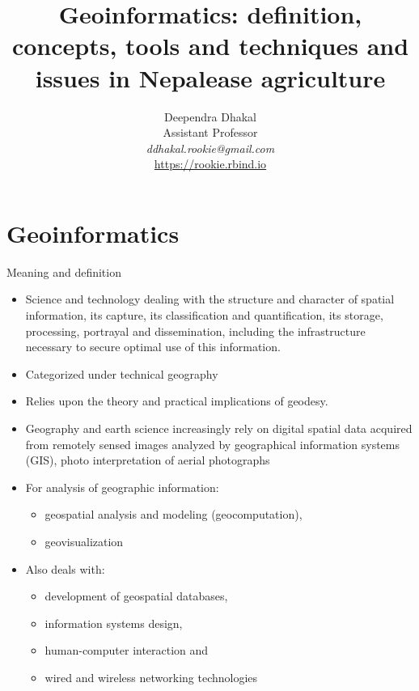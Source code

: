 \documentclass[11pt,dvipsnames,ignorenonframetext,aspectratio=169]{beamer}
\title[]{Geoinformatics: definition, concepts, tools and techniques
and issues in Nepalease agriculture}
\author[
        Deependra Dhakal\\
Assistant Professor\\
\textit{ddhakal.rookie@gmail.com}\\
\url{https://rookie.rbind.io}
    ]{Deependra Dhakal\\
Assistant Professor\\
\textit{ddhakal.rookie@gmail.com}\\
\url{https://rookie.rbind.io}}
\date[
      
  ]{
    }
\providecommand{\tightlist}{%
  \setlength{\itemsep}{0pt}\setlength{\parskip}{0pt}}
\begin{document}
  \begin{frame}[plain]
  \titlepage
  \end{frame}



\hypertarget{geoinformatics}{%
\section{Geoinformatics}\label{geoinformatics}}

\begin{frame}{Meaning and definition}
\protect\hypertarget{meaning-and-definition}{}
\begin{itemize}
\tightlist
\item
  Science and technology dealing with the structure and character of
  spatial information, its capture, its classification and
  quantification, its storage, processing, portrayal and dissemination,
  including the infrastructure necessary to secure optimal use of this
  information.
\item
  Categorized under technical geography
\item
  Relies upon the theory and practical implications of geodesy.
\item
  Geography and earth science increasingly rely on digital spatial data
  acquired from remotely sensed images analyzed by geographical
  information systems (GIS), photo interpretation of aerial photographs
\end{itemize}
\end{frame}

\begin{frame}{}
\protect\hypertarget{section}{}
\begin{itemize}
\tightlist
\item
  For analysis of geographic information:

  \begin{itemize}
  \tightlist
  \item
    geospatial analysis and modeling (geocomputation),
  \item
    geovisualization
  \end{itemize}
\item
  Also deals with:

  \begin{itemize}
  \tightlist
  \item
    development of geospatial databases,
  \item
    information systems design,
  \item
    human-computer interaction and
  \item
    wired and wireless networking technologies
  \end{itemize}
\end{itemize}
\end{frame}
\end{document}
